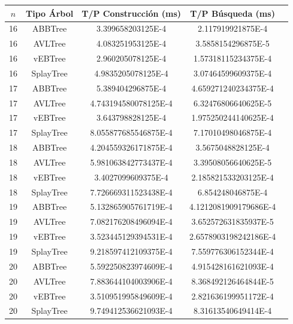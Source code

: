 \documentclass[letterpaper,12pt]{article}
\begin{document}
\begin{tabular}{|c|c|c|c|c|}
\hline
\textbf{$n$} & \textbf{Tipo Árbol} & \textbf{T/P Construcción (ms)} & \textbf{T/P Búsqueda (ms)} \\
\hline
16 & ABBTree & 3.399658203125E-4 & 2.117919921875E-4 \\
\hline
16 & AVLTree & 4.083251953125E-4  & 3.5858154296875E-5 \\
\hline
16 & vEBTree & 2.960205078125E-4  & 1.57318115234375E-4 \\
\hline
16 & SplayTree & 4.9835205078125E-4 & 3.07464599609375E-4 \\
\hline
\hline
17 & ABBTree & 5.389404296875E-4  & 4.659271240234375E-4 \\
\hline
17 & AVLTree & 4.743194580078125E-4 & 6.32476806640625E-5 \\
\hline
17 & vEBTree & 3.643798828125E-4  & 1.975250244140625E-4\\
\hline
17 & SplayTree & 8.055877685546875E-4 & 7.17010498046875E-4 \\
\hline
\hline
18 & ABBTree & 4.204559326171875E-4 & 3.5675048828125E-4 \\
\hline
18 & AVLTree & 5.981063842773437E-4 & 3.39508056640625E-5 \\
\hline
18 & vEBTree & 3.4027099609375E-4 & 2.185821533203125E-4 \\
\hline
18 & SplayTree & 7.726669311523438E-4  & 6.854248046875E-4 \\
\hline
\hline
19 & ABBTree & 5.132865905761719E-4 & 4.1212081909179686E-4 \\
\hline
19 & AVLTree & 7.082176208496094E-4  & 3.652572631835937E-5 \\
\hline
19 & vEBTree & 3.523445129394531E-4 & 2.6578903198242186E-4\\
\hline
19 & SplayTree & 9.218597412109375E-4 & 7.559776306152344E-4 \\
\hline
\hline
20 & ABBTree & 5.592250823974609E-4 & 4.915428161621093E-4 \\
\hline
20 & AVLTree & 7.883644104003906E-4 & 8.368492126464844E-5 \\
\hline
20 & vEBTree & 3.510951995849609E-4 & 2.821636199951172E-4\\
\hline
20 & SplayTree & 9.749412536621093E-4 & 8.31613540649414E-4 \\
\hline
\end{tabular}
\\ \\
\end{document}
